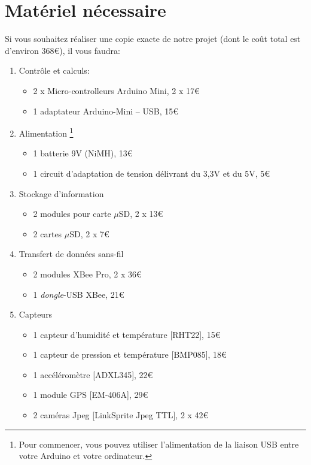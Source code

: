 \documentclass[twocolumn,landscape, 8pt]{article}
\begin{document}
\section{Matériel nécessaire}
Si vous souhaitez réaliser une copie exacte de notre projet (dont le coût total est d'environ 368\euro), il vous faudra:
\begin{enumerate}
	\item Contrôle et calculs:
		\begin{itemize}
			\item 2 x Micro-controlleurs Arduino Mini, 2 x 17\euro
			\item 1 adaptateur Arduino-Mini -- USB, 15\euro
		\end{itemize}
	\item Alimentation \footnote{Pour commencer, vous pouvez utiliser l'alimentation de la liaison USB entre votre Arduino et votre ordinateur.}
		\begin{itemize}
			\item 1 batterie 9V (NiMH), 13\euro
			\item 1 circuit d'adaptation de tension délivrant du 3,3V et du 5V, 5\euro
		\end{itemize}
	\item Stockage d'information
		\begin{itemize}
			\item 2 modules pour carte $\mu$SD, 2 x 13\euro
			\item 2 cartes $\mu$SD, 2 x 7\euro
		\end{itemize}
	\item Transfert de données sans-fil
		\begin{itemize}
			\item 2 modules XBee Pro, 2 x 36\euro 
			\item 1 \textit{dongle}-USB XBee, 21\euro
		\end{itemize}
	\item Capteurs
		\begin{itemize}
			\item 1 capteur d'humidité et température [RHT22], 15\euro
			\item 1 capteur de pression et température [BMP085], 18\euro
			\item 1 accéléromètre [ADXL345], 22\euro
			\item 1 module GPS [EM-406A], 29\euro 
			\item 2 caméras Jpeg [LinkSprite Jpeg TTL], 2 x 42\euro
		\end{itemize}
\end{enumerate}
\end{document}
